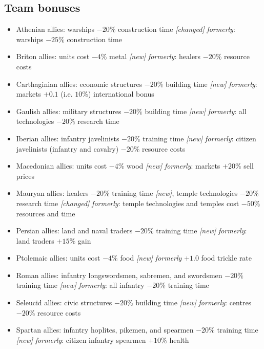 \documentclass{article}
\begin{document}
\subsection{Team bonuses}
\begin{itemize}
  \item Athenian allies: warships $-20\%$ construction time \emph{[changed]}
  \subitem \emph{formerly}: warships $-25\%$ construction time
  \item Briton allies: units cost $-4\%$ metal \emph{[new]}
  \subitem \emph{formerly}: healers $-20\%$ resource costs
  \item Carthaginian allies: economic structures $-20\%$ building time \emph{[new]}
  \subitem \emph{formerly}: markets $+0.1$ (i.e. $10\%$) international bonus
  \item Gaulish allies: military structures $-20\%$ building time \emph{[new]}
  \subitem \emph{formerly}: all technologies $-20\%$ research time
  \item Iberian allies: infantry javelinists $-20\%$ training time \emph{[new]}
  \subitem \emph{formerly}: citizen javelinists (infantry and cavalry) $-20\%$ resource costs
  \item Macedonian allies: units cost $-4\%$ wood \emph{[new]}
  \subitem \emph{formerly}: markets $+20\%$ sell prices
  \item Mauryan allies: healers $-20\%$ training time \emph{[new]}, temple technologies $-20\%$ research time \emph{[changed]}
  \subitem \emph{formerly}: temple technologies and temples cost $-50\%$ resources and time
  \item Persian allies: land and naval traders $-20\%$ training time \emph{[new]}
  \subitem \emph{formerly}: land traders $+15\%$ gain
  \item Ptolemaic allies: units cost $-4\%$ food \emph{[new]}
  \subitem \emph{formerly} $+1.0$ food trickle rate
  \item Roman allies: infantry longswordsmen, sabremen, and swordsmen $-20\%$ training time \emph{[new]}
  \subitem \emph{formerly}: all infantry $-20\%$ training time
  \item Seleucid allies: civic structures $-20\%$ building time \emph{[new]}
  \subitem \emph{formerly}: centres $-20\%$ resource costs
  \item Spartan allies: infantry hoplites, pikemen, and spearmen $-20\%$ training time \emph{[new]}
  \subitem \emph{formerly}: citizen infantry spearmen $+10\%$ health
\end{itemize}
\end{document}
